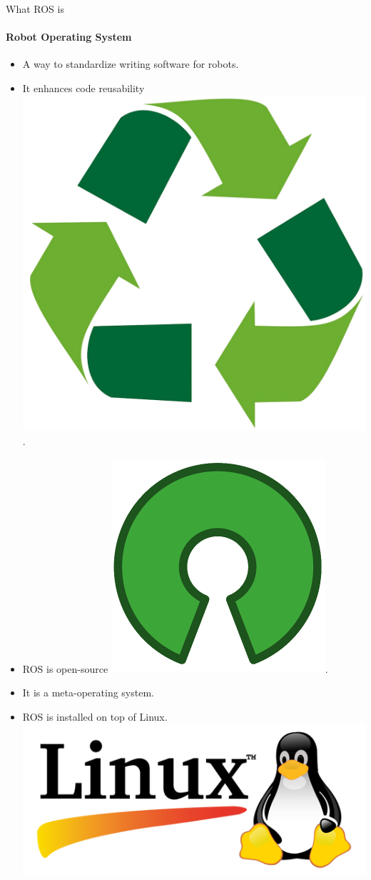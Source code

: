 \documentclass{beamer}
\begin{document}
\begin{frame}{What ROS is}
    \framesubtitle{Robot Operating System}
    \begin{itemize}
        \item A way to standardize writing software for robots.
        \item It enhances {\huge code reusability} \includegraphics[scale=0.02]{figures/recycling.png}.
        \item ROS is open-source \includegraphics[scale=0.09]{figures/open_source.png}.
        \item It is a meta-operating system.
        \item ROS is installed on top of Linux.  \includegraphics[width=.1\linewidth]{figures/linux_logo.png}

    \end{itemize}
\end{frame}
\end{document}
